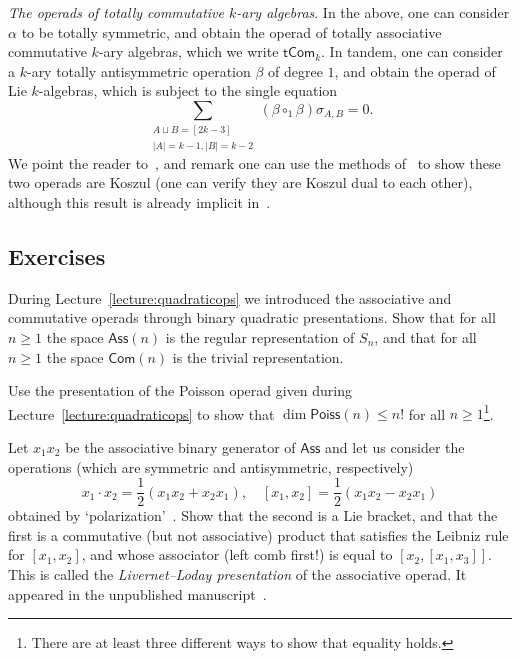 \emph{The operads of totally commutative $k$-ary algebras}. 
In the above, one can consider $\alpha$ to be
totally symmetric, and obtain the operad of totally
associative commutative $k$-ary algebras, which we
write $\mathsf{tCom}_k$. In tandem, one 
can consider a $k$-ary totally antisymmetric operation
$\beta$ of degree $1$, and obtain the operad of Lie $k$-algebras, 
which is subject to the single equation
\[
 \sum_{\substack{A\sqcup B = [2k-3] \\
 |A|=k-1,|B|=k-2}}  (\beta\circ_1\beta)\sigma_{A,B} = 0.
 \]
 We point the reader to~\cite{Hanlon1995}, and remark
 one can use the methods of~\cite{Vallette2007} to show these two 
 operads are Koszul (one can verify they are Koszul
 dual to each other), although this result is already
 implicit in~\cite{Hanlon1995}.
  
\subsection{Exercises}


 \begin{question}
During Lecture~\ref{lecture:quadraticops} we introduced the associative and commutative operads
through binary quadratic presentations. Show  that 
for all $n\geqslant 1$ the space $\mathsf{Ass}(n)$ is the
regular representation of $S_n$, and that for 
all $n\geqslant 1$ the space $\mathsf{Com}(n)$ is the 
trivial representation.
\end{question}

\begin{question} Use the presentation of the Poisson operad given
during Lecture~\ref{lecture:quadraticops} to show that $\dim\mathsf{Poiss}(n)\leqslant n!$
for all $n\geqslant 1$\footnote{There are at least three different
ways to show that equality holds.}. 
\end{question}

\begin{question}\label{ex:LivLod} Let $x_1x_2$ be the associative binary generator of
$\mathsf{Ass}$ and let us consider the operations (which are symmetric
and antisymmetric, respectively)
\[x_1\cdot x_2 = \frac{1}{2}(x_1x_2+x_2x_1), \quad 
	 [x_1,x_2] = \frac{1}{2}(x_1x_2-x_2x_1) 	
	 \]
obtained by `polarization'~\cite{Markl2006}. 
Show that the second is a Lie bracket,
and that the first is a commutative (but not associative) product
that satisfies the Leibniz rule for $[x_1,x_2]$, and whose associator (left comb first!)
is equal to $[x_2,[x_1,x_3]]$. This is called the \emph{Livernet--Loday
presentation} of the associative operad. It appeared in
the unpublished manuscript~\cite{Livernet1998}.
\end{question}

